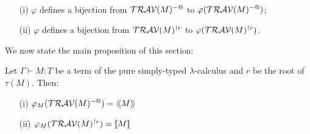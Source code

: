 \begin{cor} \
\label{cor:varphi_bij}
\begin{itemize}
\item[(i)] $\varphi$ defines a bijection from $\mathcal{TRAV}(M)^{-@}$
to $\varphi(\mathcal{TRAV}(M)^{-@})$;
\item[(ii)] $\varphi$ defines a bijection from $\mathcal{TRAV}(M)^{\upharpoonright r}$ to
$\varphi(\mathcal{TRAV}(M)^{\upharpoonright r})$.
\end{itemize}
\end{cor}





We now state the main proposition of this section:
\begin{prop}
\label{prop:rel_gamesem_trav} Let $\Gamma \vdash M : T$ be a
term of the pure simply-typed $\lambda$-calculus and $r$ be the root
of $\tau(M)$. Then:
\begin{itemize}
\item[(i)]  $\varphi_M(\mathcal{TRAV}(M)^{-@}) = {\langle\!\langle M \rangle\!\rangle}$
\item[(ii)] $\varphi_M(\mathcal{TRAV}(M)^{\upharpoonright r}) = {[\![ M ]\!]}$
\end{itemize}
\end{prop}


